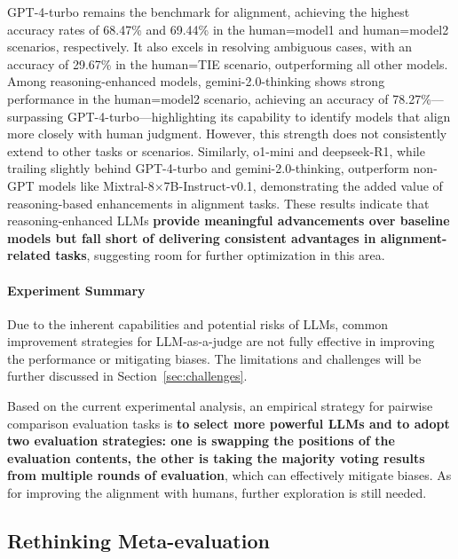 GPT-4-turbo remains the benchmark for alignment, achieving the highest accuracy rates of 68.47\% and 69.44\% in the human=model1 and human=model2 scenarios, respectively. It also excels in resolving ambiguous cases, with an accuracy of 29.67\% in the human=TIE scenario, outperforming all other models. 
Among reasoning-enhanced models, gemini-2.0-thinking shows strong performance in the human=model2 scenario, achieving an accuracy of 78.27\%—surpassing GPT-4-turbo—highlighting its capability to identify models that align more closely with human judgment. However, this strength does not consistently extend to other tasks or scenarios. Similarly, o1-mini and deepseek-R1, while trailing slightly behind GPT-4-turbo and gemini-2.0-thinking, outperform non-GPT models like Mixtral-8$\times$7B-Instruct-v0.1, demonstrating the added value of reasoning-based enhancements in alignment tasks.
These results indicate that reasoning-enhanced LLMs \textbf{provide meaningful advancements over baseline models but fall short of delivering consistent advantages in alignment-related tasks}, suggesting room for further optimization in this area.




\paragraph{\textbf{Experiment Summary}}
Due to the inherent capabilities and potential risks of LLMs, common improvement strategies for LLM-as-a-judge are not fully effective in improving the performance or mitigating biases. The limitations and challenges will be further discussed in Section~\ref{sec:challenges}. 

Based on the current experimental analysis, an empirical strategy for pairwise comparison evaluation tasks is \textbf{to select more powerful LLMs and to adopt two evaluation strategies: one is swapping the positions of the evaluation contents, the other is taking the majority voting results from multiple rounds of evaluation}, which can effectively mitigate biases. As for improving the alignment with humans, further exploration is still needed.


\subsection{Rethinking Meta-evaluation}
\label{subsec: 4_5_rethinking_eval}



